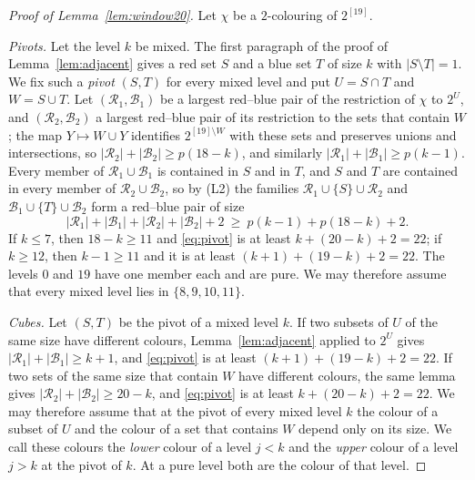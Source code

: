 \documentclass[11pt,reqno]{amsart}
\numberwithin{equation}{section}
\theoremstyle{plain}
\theoremstyle{definition}
\theoremstyle{remark}
\newcommand{\cB}{\mathcal{B}}
\newcommand{\cR}{\mathcal{R}}
\begin{document}
\begin{proof}[Proof of Lemma~\ref{lem:window20}]
Let $\chi$ be a $2$-colouring of $2^{[19]}$.

\emph{Pivots.} Let the level $k$ be mixed. The first paragraph of the
proof of Lemma~\ref{lem:adjacent} gives a red set $S$ and a blue set $T$
of size $k$ with $|S\setminus T|=1$. We fix such a \emph{pivot} $(S,T)$
for every mixed level and put $U=S\cap T$ and $W=S\cup T$. Let
$(\cR_1,\cB_1)$ be a largest red--blue pair of the restriction of $\chi$
to $2^{U}$, and $(\cR_2,\cB_2)$ a largest red--blue pair of its
restriction to the sets that contain $W$; the map $Y\mapsto W\cup Y$
identifies $2^{[19]\setminus W}$ with these sets and preserves unions and
intersections, so $|\cR_2|+|\cB_2|\ge p(18-k)$, and similarly
$|\cR_1|+|\cB_1|\ge p(k-1)$. Every member of $\cR_1\cup\cB_1$ is
contained in $S$ and in $T$, and $S$ and $T$ are contained in every member
of $\cR_2\cup\cB_2$, so by (L2) the families $\cR_1\cup\{S\}\cup\cR_2$ and
$\cB_1\cup\{T\}\cup\cB_2$ form a red--blue pair of size
\begin{equation}
\label{eq:pivot}
|\cR_1|+|\cB_1|+|\cR_2|+|\cB_2|+2\ \ge\ p(k-1)+p(18-k)+2.
\end{equation}
If $k\le7$, then $18-k\ge11$ and \eqref{eq:pivot} is at least
$k+(20-k)+2=22$; if $k\ge12$, then $k-1\ge11$ and it is at least
$(k+1)+(19-k)+2=22$. The levels $0$ and $19$ have one member each and are
pure. We may therefore assume that every mixed level lies in
$\{8,9,10,11\}$.

\emph{Cubes.} Let $(S,T)$ be the pivot of a mixed level $k$. If two
subsets of $U$ of the same size have different colours,
Lemma~\ref{lem:adjacent} applied to $2^{U}$ gives
$|\cR_1|+|\cB_1|\ge k+1$, and \eqref{eq:pivot} is at least
$(k+1)+(19-k)+2=22$. If two sets of the same size that contain $W$ have
different colours, the same lemma gives $|\cR_2|+|\cB_2|\ge20-k$, and
\eqref{eq:pivot} is at least $k+(20-k)+2=22$. We may therefore assume
that at the pivot of every mixed level $k$ the colour of a subset of $U$
and the colour of a set that contains $W$ depend only on its size. We
call these colours the \emph{lower} colour of a level $j<k$ and the
\emph{upper} colour of a level $j>k$ at the pivot of $k$. At a pure level
both are the colour of that level.


\end{proof}
\end{document}
